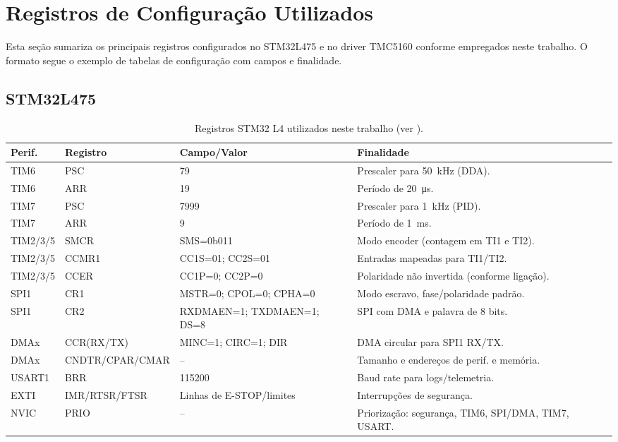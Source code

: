 \section{Registros de Configura\c{c}\~ao Utilizados}

Esta se\c{c}\~ao sumariza os principais registros configurados no STM32L475 e
no driver TMC5160 conforme empregados neste trabalho. O formato segue o
exemplo de tabelas de configura\c{c}\~ao com campos e finalidade.

\subsection{STM32L475}

\begin{table}[h]
  \centering
  \caption{Registros STM32 L4 utilizados neste trabalho (ver \cite{st_an4013,stm32l4_rm}).}
  \label{tab:regs-stm32}
  \setlength{\tabcolsep}{4pt}\footnotesize
  \begin{tabularx}{\textwidth}{lllX}
    \toprule
    Perif. & Registro & Campo/Valor & Finalidade \\
    \midrule
    TIM6 & PSC & 79 & Prescaler para \SI{50}{kHz} (DDA). \\
    TIM6 & ARR & 19 & Per\'iodo de \SI{20}{\micro s}. \\
    TIM7 & PSC & 7999 & Prescaler para \SI{1}{kHz} (PID). \\
    TIM7 & ARR & 9 & Per\'iodo de \SI{1}{ms}. \\
    TIM2/3/5 & SMCR & SMS=0b011 & Modo encoder (contagem em TI1 e TI2). \\
    TIM2/3/5 & CCMR1 & CC1S=01; CC2S=01 & Entradas mapeadas para TI1/TI2. \\
    TIM2/3/5 & CCER & CC1P=0; CC2P=0 & Polaridade n\~ao invertida (conforme liga\c{c}\~ao). \\
    SPI1 & CR1 & MSTR=0; CPOL=0; CPHA=0 & Modo escravo, fase/polaridade padr\~ao. \\
    SPI1 & CR2 & RXDMAEN=1; TXDMAEN=1; DS=8 & SPI com DMA e palavra de 8 bits. \\
    DMAx & CCR(RX/TX) & MINC=1; CIRC=1; DIR & DMA circular para SPI1 RX/TX. \\
    DMAx & CNDTR/CPAR/CMAR & -- & Tamanho e endere\c{c}os de perif. e mem\'oria. \\
    USART1 & BRR & 115200 & Baud rate para logs/telemetria. \\
    EXTI & IMR/RTSR/FTSR & Linhas de E-STOP/limites & Interrup\c{c}\~oes de seguran\c{c}a. \\
    NVIC & PRIO & -- & Prioriza\c{c}\~ao: seguran\c{c}a, TIM6, SPI/DMA, TIM7, USART. \\
    \bottomrule
  \end{tabularx}
\end{table}

